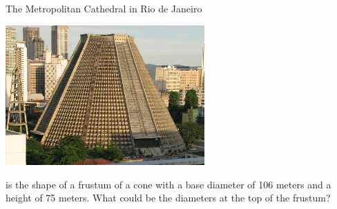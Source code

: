 \documentclass{ximera}
\begin{document}
\begin{exercise}%
  The Metropolitan Cathedral in Rio de Janeiro 
  \begin{center}
    \includegraphics[width=3in]{CatedralMetropolitanaRiodeJaneiro.jpg}
  \end{center}  
  is the shape of a frustum of a cone with a base diameter of 106
  meters and a height of 75 meters. What could be the diameters at the
  top of the frustum?
\end{exercise}



\end{document}
